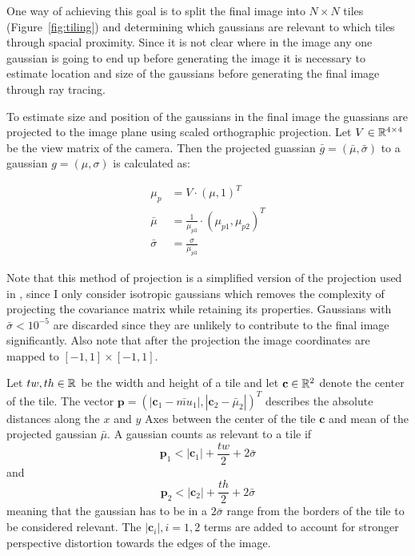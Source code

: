 \documentclass[a4paper, 11pt]{memoir}
\begin{document}
    One way of achieving this goal is to split the final image into $N \times N$ tiles (\eg Figure~\ref{fig:tiling}) and determining which gaussians
    are relevant to which tiles through spacial proximity. Since it is not clear where in the image any one gaussian is
    going to end up before generating the image it is necessary to estimate location and size of the gaussians before
    generating the final image through ray tracing.

    To estimate size and position of the gaussians in the final image the guassians are projected to the image plane using
    scaled orthographic projection. Let $V \in \mathbb{R}^{4 \times 4}$ be the view matrix of the camera. Then the projected guassian
    $\bar{g} = (\bar{\mu}, \bar{\sigma})$ to a gaussian $g = (\mu, \sigma)$ is calculated as:

    \begin{align}
        \mu_p &= V \cdot (\mu, 1)^T\\
        \bar{\mu} &= \frac{1}{\mu_{p3}} \cdot (\mu_{p1}, \mu_{p2})^T\\
        \bar{\sigma} &= \frac{\sigma}{\mu_{p3}}
    \end{align}

    Note that this method of projection is a simplified version of the projection used in \cite{kerbl3Dgaussians}, since I only consider isotropic gaussians which removes
    the complexity of projecting the covariance matrix while retaining its properties.
    Gaussians with $\bar{\sigma} < 10^{-5}$ are discarded since they are unlikely to contribute to the final image significantly. Also note that after the projection
    the image coordinates are mapped to $[-1, 1] \times [-1, 1]$.

    Let $tw, th \in \mathbb{R}$ be the width and height of a tile and let $\mathbf{c} \in \mathbb{R}^2$ denote the center of the tile. The vector $\mathbf{p} = (|\mathbf{c}_1 - \bar{mu}_1|, |\mathbf{c}_2 - \bar{\mu}_2|)^T$
    describes the absolute distances along the $x$ and $y$ Axes between the center of the tile $\mathbf{c}$ and mean of the projected gaussian $\bar{\mu}$.
    A gaussian counts as relevant to a tile if
    \begin{equation}
        \mathbf{p}_1 < |\mathbf{c}_1| + \frac{tw}{2} + 2\bar{\sigma}
    \end{equation}
    and 
    \begin{equation}
        \mathbf{p}_2 < |\mathbf{c}_2| + \frac{th}{2} + 2\bar{\sigma}
    \end{equation}
    meaning that the gaussian has to be in a $2\bar{\sigma}$ range from the borders of the tile to be considered relevant.
    The $|\mathbf{c}_i|, i=1,2$ terms are added to account for stronger perspective distortion towards the edges of the image.
\end{document}
